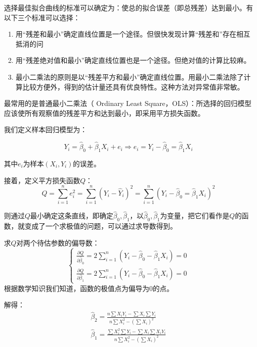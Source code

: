 \documentclass[a4paper,12pt]{article}
\begin{document}
选择最佳拟合曲线的标准可以确定为：使总的拟合误差（即总残差）达到最小。有以下三个标准可以选择：
\begin{enumerate}[1.~]
    \item 用“残差和最小”确定直线位置是一个途径。但很快发现计算“残差和”存在相互抵消的问
    \item 用“残差绝对值和最小”确定直线位置也是一个途径。但绝对值的计算比较麻。
    \item 最小二乘法的原则是以“残差平方和最小”确定直线位置。用最小二乘法除了计算比较方便外，得到的估计量还具有优良特性。这种方法对异常值非常敏。
\end{enumerate}

最常用的是普通最小二乘法（ Ordinary  Least Square，OLS）：所选择的回归模型应该使所有观察值的残差平方和达到最小，即采用平方损失函数。 　

我们定义样本回归模型为：

\begin{equation}
  Y_i=\widehat\beta_0+\widehat\beta_1X_i+e_i\Rightarrow e_i=Y_i-\widehat\beta_0=\widehat\beta_1X_i
\end{equation}

其中$e_i$为样本$(X_i,Y_i)$的误差。

接着，定义平方损失函数$Q$：
\begin{equation}
  Q=\sum_{i=1}^ne_i^2=\sum_{i=1}^n(Y_i-\widehat Y_i)^2=\sum_{i=1}^n(Y_i-\widehat\beta_0=\widehat\beta_1X_i)^2
\end{equation}

则通过$Q$最小确定这条直线，即确定$\widehat\beta_0,\widehat\beta_1$，以$\widehat\beta_0,\widehat\beta_1$为变量，把它们看作是$Q$的函数，就变成了一个求极值的问题，可以通过求导数得到。

求$Q$对两个待估参数的偏导数：
\begin{equation}
  \left\{\begin{array}{c}
      \frac{\partial Q}{\partial\widehat\beta_0}=2\sum_{i=1}^n(Y_i-\widehat\beta_0-\widehat\beta_1X_i)=0\\
      \frac{\partial Q}{\partial\widehat\beta_1}=2\sum_{i=1}^n(Y_i-\widehat\beta_0-\widehat\beta_1X_i)=0
  \end{array}\right.
\end{equation}
 根据数学知识我们知道，函数的极值点为偏导为$0$的点。
 
 解得：
\begin{equation}
  \begin{split}
    \widehat\beta_2=\frac{n\sum X_iY_i-\sum X_i\sum Y_i}{n\sum X_i^2-(\sum X_i)^2}\\
    \widehat\beta_1=\frac{\sum X_i^2\sum Y_i-\sum X_i\sum X_iY_i}{n\sum X_i^2-(\sum X_i)^2}
  \end{split}
\end{equation}
\end{document}
